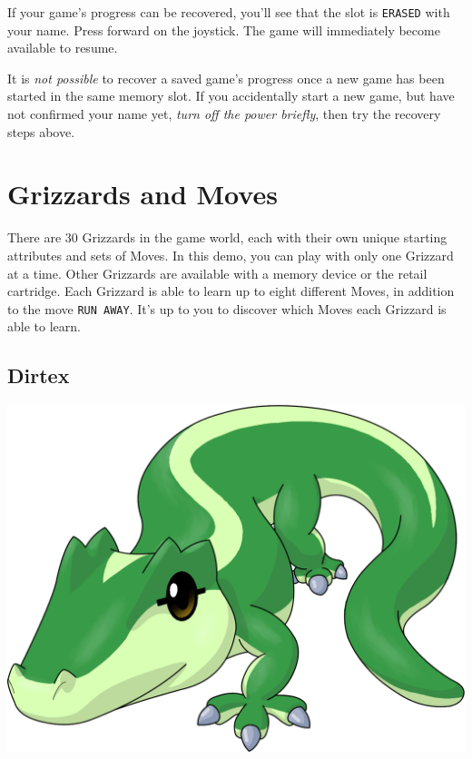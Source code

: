 \documentclass[10pt,twocolumn,openany,article]{memoir}
\begin{document}
If your  game's progress can be  recovered, you'll see that  the slot is
\texttt{ERASED} with your name. Press  forward on the joystick. The game
will immediately become available to resume.

It is \emph{not possible} to recover  a saved game's progress once a new
game has been started in the same memory slot. If you accidentally start
a new  game, but have  not confirmed your  name yet, \emph{turn  off the
  power briefly}, then try the recovery steps above.

\fi

\fi %

\chapter{Grizzards and Moves}\label{ch:Grizzards}

There are  30 Grizzards in  the game world,  each with their  own unique
starting attributes and  sets of Moves. \ifdefined\NOSAVE  In this demo,
you  can play  with only  one Grizzard  at a  time. Other  Grizzards are
available  with  a memory  device  or  the  retail cartridge.  \fi  Each
Grizzard is able  to learn up to  eight different Moves, in  addition to the
move \texttt{RUN  AWAY}. It's  up to  you to  discover which  Moves each
Grizzard is able to learn.



\ifdefined\DEMO\else

\pagebreak

\section{Dirtex}

\begin{center}
  \vspace{14pt}
  \includegraphics[width=\columnwidth]{../Manual/Dirtex.png}
  \vspace{14pt}
\end{center}
\end{document}

